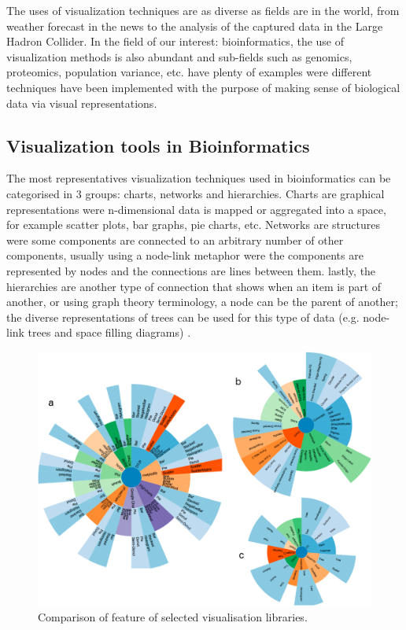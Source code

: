 The uses of visualization techniques are as diverse as fields are in the world, from weather forecast in the news to the analysis of the captured data in the Large Hadron Collider. In the field of our interest: bioinformatics, the use of visualization methods is also abundant and sub-fields such as genomics, proteomics, population variance, etc. have plenty of examples were different techniques have been implemented with the purpose of making sense of biological data via visual representations.


\subsection{Visualization tools in Bioinformatics}
The most representatives visualization techniques used in bioinformatics can be categorised in 3 groups: charts, networks and hierarchies. Charts are graphical representations were n-dimensional data is mapped or aggregated into a space, for example scatter plots, bar graphs, pie charts, etc. Networks are structures were some components are connected to an arbitrary number of other components, usually using a node-link metaphor were the components are represented by nodes and the connections are lines between them. lastly, the hierarchies are another type of connection that shows when an item is part of another, or using graph theory terminology, a node can be the parent of another; the diverse representations of trees can be used for this type of data (e.g. node-link trees and space filling diagrams) \cite{WAN2014}. 

\begin{figure}  
\centering
\includegraphics[width=\textwidth]{figures/vis_libs.png}
\caption[Comparison of feature of selected visualisation libraries.]{Comparison of feature of selected visualisation libraries.
\label{fig:vis_libs}}
\end{figure}


